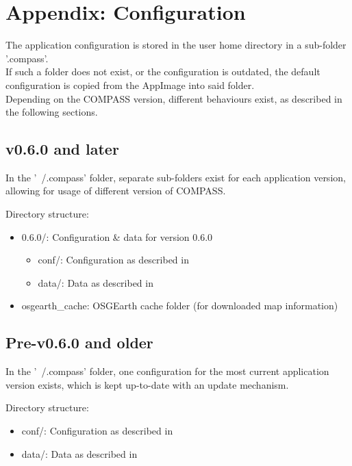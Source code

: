 \section{Appendix: Configuration}
\label{sec:appendix_configuration}

The application configuration is stored in the user home directory in a sub-folder '.compass'. \\

If such a folder does not exist, or the configuration is outdated, the default configuration is copied from the AppImage into said folder. \\

Depending on the COMPASS version, different behaviours exist, as described in the following sections.

\subsection{v0.6.0 and later}

In the '~/.compass' folder, separate sub-folders exist for each application version, allowing for usage of different version of COMPASS.

Directory structure:
\begin{itemize}
\item 0.6.0/: Configuration \& data for version 0.6.0
\begin{itemize}
\item conf/: Configuration as described in 
\item data/: Data as described in 
\end{itemize}
\item osgearth\_cache: OSGEarth cache folder (for downloaded map information)
\end{itemize}


\subsection{Pre-v0.6.0 and older}

In the '~/.compass' folder, one configuration for the most current application version exists, which is kept up-to-date with an update mechanism.

Directory structure:
\begin{itemize}
\item conf/: Configuration as described in 
\item data/: Data as described in 
\end{itemize}

